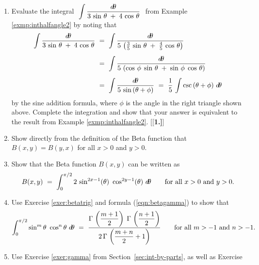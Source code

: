 {\begin{enumerate}[\bfseries 1.]
[{[\bfseries 1.]}]
 \item Evaluate the integral $~\displaystyle\int \frac{d\!\theta}{3\,\sin\,\theta
  \;+\; 4\,\cos\,\theta}~$ from Example \ref{exmp:inthalfangle2} by noting that
\begin{align*}
\int \frac{d\!\theta}{3\,\sin\,\theta \;+\; 4\,\cos\,\theta} ~&=~
\int \frac{d\!\theta}{5\,\left(\frac{3}{5}\,\sin\,\theta \;+\; \frac{4}{5}\,\cos\,\theta\right)}\\[5pt]
&=~ \int \frac{d\!\theta}{5\,\left(\cos\,\phi\;\sin\,\theta \;+\; \sin\,\phi\;\cos\,\theta\right)}\\[5pt]
&=~ \int \frac{d\!\theta}{5\,\sin\,(\theta + \phi)}
~=~ \frac{1}{5}\,\int \csc\,(\theta + \phi)~d\!\theta
\end{align*}\vspace{-6mm}
by the sine addition formula, where $\phi$ is the angle in the right triangle
shown above. Complete the integration and show that your answer is
equivalent to the result from Example \ref{exmp:inthalfangle2}.
[{[\bfseries 1.]}]
 \item Show directly from the definition of the Beta function that
  $B(x,y) = B(y,x)$ for all $x > 0$ and $y > 0$.
 \item\label{exer:betatrig} Show that the Beta function $B(x,y)$ can be written
  as
\[
B(x,y) ~=~ \int_0^{\pi/2} 2\,\sin^{2x-1}(\theta)~\cos^{2y-1}(\theta)~d\!\theta
\qquad\text{for all $x > 0$ and $y > 0$.}
\]
 \item\label{exer:intsinmcosn} Use Exercise \ref{exer:betatrig} and formula
(\ref{eqn:betagamma}) to show that
\[
\int_0^{\pi/2} \sin^{m}\theta~\cos^{n}\theta~d\!\theta ~=~
\frac{\Gamma\,\left(\dfrac{m+1}{2}\right) \; 
\Gamma\,\left(\dfrac{n+1}{2}\right)}{2\,\Gamma\,\left(\dfrac{m+n}{2} + 1\right)}
\qquad\text{for all $m > -1$ and $n > -1$.}
\]
 \item Use Exercise \ref{exer:gamma} from Section~\ref{sec:int-by-parts}, as well as Exercise

\end{enumerate}}
